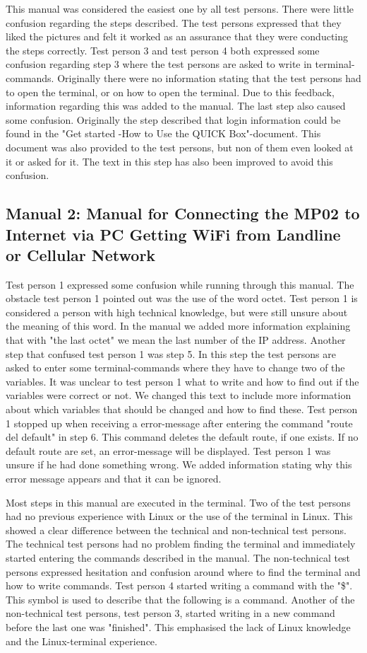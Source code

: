 This manual was considered the easiest one by all test persons. There were little confusion regarding the steps described. The test persons expressed that they liked the pictures and felt it worked as an assurance that they were conducting the steps correctly. Test person 3 and test person 4 both expressed some confusion regarding step 3 where the test persons are asked to write in terminal-commands. Originally there were no information stating that the test persons had to open the terminal, or on how to open the terminal. Due to this feedback, information regarding this was added to the manual. The last step also caused some confusion. Originally the step described that login information could be found in the "Get started -How to Use the QUICK Box"-document. This document was also provided to the test persons, but non of them even looked at it or asked for it. The text in this step has also been improved to avoid this confusion. 

\subsection{Manual 2: Manual for Connecting the MP02 to Internet via PC Getting WiFi from Landline or Cellular Network}
Test person 1 expressed some confusion while running through this manual. The obstacle test person 1 pointed out was the use of the word octet. Test person 1 is considered a person with high technical knowledge, but were still unsure about the meaning of this word. In the manual we added more information explaining that with "the last octet" we mean the last number of the IP address. Another step that confused test person 1 was step 5. In this step the test persons are asked to enter some terminal-commands where they have to change two of the variables. It was unclear to test person 1 what to write and how to find out if the variables were correct or not. We changed this text to include more information about which variables that should be changed and how to find these. Test person 1 stopped up when receiving a error-message after entering the command "route del default" in step 6. This command deletes the default route, if one exists. If no default route are set, an error-message will be displayed. Test person 1 was unsure if he had done something wrong. We added information stating why this error message appears and that it can be ignored. 

Most steps in this manual are executed in the terminal. Two of the test persons had no previous experience with Linux or the use of the terminal in Linux. This showed a clear difference between the technical and non-technical test persons. The technical test persons had no problem finding the terminal and immediately started entering the commands described in the manual. The non-technical test persons expressed hesitation and confusion around where to find the terminal and how to write commands. Test person 4 started writing a command with the "\$". This symbol is used to describe that the following is a command. Another of the non-technical test persons, test person 3, started writing in a new command before the last one was "finished". This emphasised the lack of Linux knowledge and the Linux-terminal experience.   

